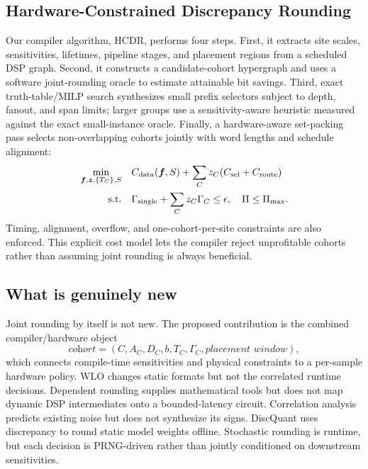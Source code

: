 \documentclass[conference]{IEEEtran}
\newcommand{\vect}[1]{\bm{#1}}
\begin{document}
\subsection{Hardware-Constrained Discrepancy Rounding}
Our compiler algorithm, HCDR, performs four steps. First, it extracts site
scales, sensitivities, lifetimes, pipeline stages, and placement regions from a
scheduled DSP graph. Second, it constructs a candidate-cohort hypergraph and
uses a software joint-rounding oracle to estimate attainable bit savings.
Third, exact truth-table/MILP search synthesizes small prefix selectors subject
to depth, fanout, and span limits; larger groups use a sensitivity-aware
heuristic measured against the exact small-instance oracle. Finally, a
hardware-aware set-packing pass selects non-overlapping cohorts jointly with
word lengths and schedule alignment:
\begin{align}
 \min_{\vect f,\vect z,\{T_C\},S}\quad &
 C_{\rm data}(\vect f,S)+\sum_Cz_C(C_{\rm sel}+C_{\rm route}) \notag\\
 \text{s.t.}\quad &\Gamma_{\rm single}+\sum_Cz_C\Gamma_C\le\epsilon,
 \quad \mathrm{II}\le\mathrm{II}_{\max}. \label{eq:global}
\end{align}
Timing, alignment, overflow, and one-cohort-per-site constraints are also
enforced. This explicit cost model lets the compiler reject unprofitable
cohorts rather than assuming joint rounding is always beneficial.

\subsection{What is genuinely new}
Joint rounding by itself is not new. The proposed contribution is the combined
compiler/hardware object
\begin{equation}
 \textit{cohort}=(C,A_C,D_C,b,T_C,\Gamma_C,\textit{placement window}),
 \label{eq:object}
\end{equation}
which connects compile-time sensitivities and physical constraints to a
per-sample hardware policy. WLO changes static formats but not the correlated
runtime decisions. Dependent rounding supplies mathematical tools but does not
map dynamic DSP intermediates onto a bounded-latency circuit. Correlation
analysis predicts existing noise but does not synthesize its signs. DiscQuant
uses discrepancy to round static model weights offline. Stochastic rounding is
runtime, but each decision is PRNG-driven rather than jointly conditioned on
downstream sensitivities.
\end{document}
